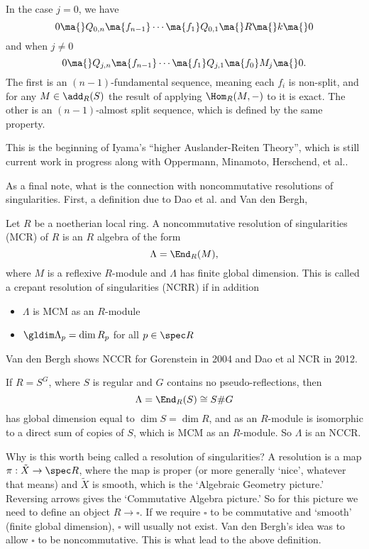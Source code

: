 \begin{thm}
In the case $j=0$, we have
	\[
	0 \ma{} Q_{0,n} \ma{f_{n-1}} \cdots \ma{f_1} Q_{0,1} \ma{} R \ma{} k \ma{} 0
	\]
and when $j \neq 0$
	\[
	0 \ma{} Q_{j,n} \ma{f_{n-1}} \cdots \ma{f_1}  Q_{j,1} \ma{f_0} M_j \ma{} 0.
	\]
The first is an $(n-1)$-fundamental sequence, meaning each $f_i$ is non-split, and for any $M \in \add_R(S)$ the result of applying $\Hom_R(M,-)$ to it is exact. The other is an $(n-1)$-almost split sequence, which is defined by the same property. 
\end{thm}


This is the beginning of Iyama's ``higher Auslander-Reiten Theory'', which is still current work in progress along with Oppermann, Minamoto, Herschend, et al.. 


As a final note, what is the connection with noncommutative resolutions of singularities. First, a definition due to Dao et al. and Van den Bergh,


\begin{dfn}
Let $R$ be a noetherian local ring. A noncommutative resolution of singularities (MCR) of $R$ is an $R$ algebra of the form 
	\[
	\Lambda= \End_R(M),
	\]
where $M$ is a reflexive $R$-module and $\Lambda$ has finite global dimension. This is called a crepant resolution of singularities (NCRR) if in addition
	\begin{itemize}
	\item $\Lambda$ is MCM as an $R$-module
	\item $\gldim \Lambda_p= \dim R_p$ for all $p \in \spec R$ 
	\end{itemize}
\end{dfn}



Van den Bergh shows NCCR for Gorenstein in 2004 and Dao et al NCR in 2012. 

\begin{ex}
If $R= S^G$, where $S$ is regular and $G$ contains no pseudo-reflections, then
	\[
	\Lambda= \End_R(S) \cong S\#G
	\]
has global dimension equal to $\dim S= \dim R$, and as an $R$-module is isomorphic to a direct sum of copies of $S$, which is MCM as an $R$-module. So $\Lambda$ is an NCCR. 
\end{ex}


Why is this worth being called a resolution of singularities? A resolution is a map $\pi: \tilde{X} \to \spec R$, where the map is proper (or more generally `nice', whatever that means) and $\tilde{X}$ is smooth, which is the `Algebraic Geometry picture.' Reversing arrows gives the `Commutative Algebra picture.' So for this picture we need to define an object $R \to \square$. If we require $\square$ to be commutative and `smooth' (finite global dimension), $\square$ will usually not exist. Van den Bergh's idea was to allow $\square$ to be noncommutative. This is what lead to the above definition. 


